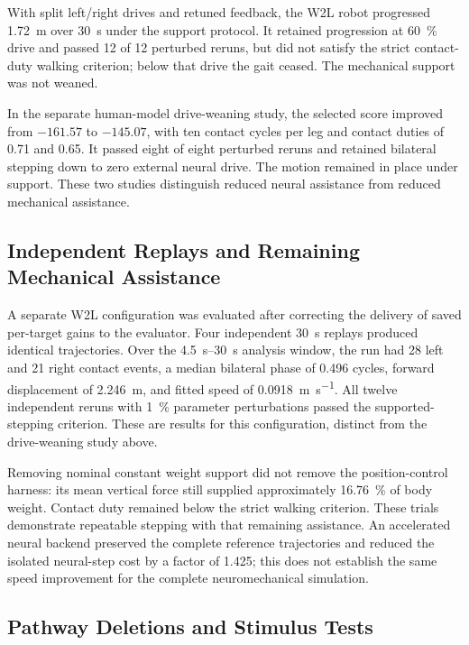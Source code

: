 With split left/right drives and retuned feedback, the W2L robot progressed \qty{1.72}{\meter} over \qty{30}{\second} under the support protocol. It retained progression at \qty{60}{\percent} drive and passed 12 of 12 perturbed reruns, but did not satisfy the strict contact-duty walking criterion; below that drive the gait ceased. The mechanical support was not weaned.

In the separate human-model drive-weaning study, the selected score improved from $-161.57$ to $-145.07$, with ten contact cycles per leg and contact duties of 0.71 and 0.65. It passed eight of eight perturbed reruns and retained bilateral stepping down to zero external neural drive. The motion remained in place under support. These two studies distinguish reduced neural assistance from reduced mechanical assistance.



\subsection{Independent Replays and Remaining Mechanical Assistance}\label{sec:app_supported_replays}

A separate W2L configuration was evaluated after correcting the delivery of saved per-target gains to the evaluator. Four independent \qty{30}{\second} replays produced identical trajectories. Over the \qtyrange{4.5}{30}{\second} analysis window, the run had 28 left and 21 right contact events, a median bilateral phase of 0.496 cycles, forward displacement of \qty{2.246}{\meter}, and fitted speed of \qty{0.0918}{\meter\per\second}. All twelve independent reruns with \qty{1}{\percent} parameter perturbations passed the supported-stepping criterion. These are results for this configuration, distinct from the drive-weaning study above.

Removing nominal constant weight support did not remove the position-control harness: its mean vertical force still supplied approximately \qty{16.76}{\percent} of body weight. Contact duty remained below the strict walking criterion. These trials demonstrate repeatable stepping with that remaining assistance. An accelerated neural backend preserved the complete reference trajectories and reduced the isolated neural-step cost by a factor of 1.425; this does not establish the same speed improvement for the complete neuromechanical simulation.

\subsection{Pathway Deletions and Stimulus Tests}\label{sec:app_w2l_perturbations}

